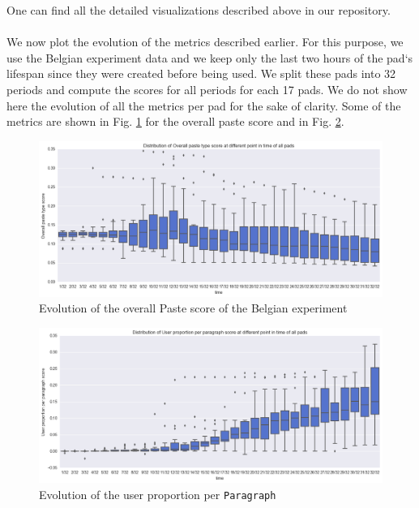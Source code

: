 \documentclass[a4, twocolumn, 12pt]{article}
\begin{document}
One can find all the detailed visualizations described above in our repository.
\\
\\
We now plot the evolution of the metrics described earlier. For this purpose, we use the Belgian experiment data and we keep only the last two hours of the pad‘s lifespan since they were created before being used. We split these pads into 32 periods and compute the scores for all periods for each 17 pads. We do not show here the evolution of all the metrics per pad for the sake of clarity. Some of the metrics are shown in Fig. \ref{boxplot_zoomed_Overall paste type score} for the overall paste score and in Fig. \ref{boxplot_zoomed_User proportion per paragraph score}.
\begin{figure}[h]
\includegraphics[scale=0.26]{figures/boxplot_zoomed_Overall_paste_type_score.png}
\caption{Evolution of the overall Paste score of the Belgian experiment}
\label{boxplot_zoomed_Overall paste type score}
\end{figure}

\begin{figure}[h]
\centering
\includegraphics[scale=0.26]{figures/boxplot_zoomed_User_proportion_per_paragraph_score.png}
\caption{Evolution of the user proportion per \texttt{Paragraph}}
\label{boxplot_zoomed_User proportion per paragraph score}
\end{figure}
\end{document}
